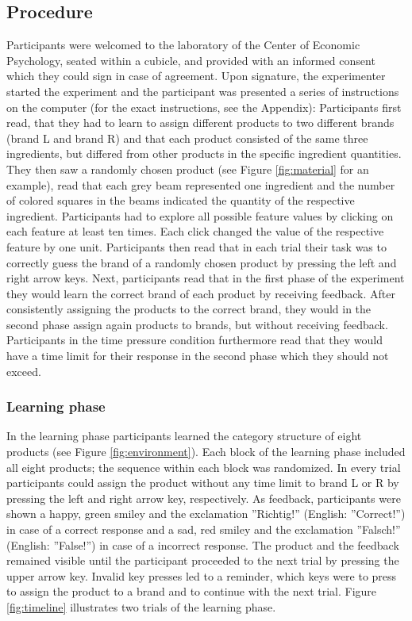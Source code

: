 \documentclass[a4paper,man,natbib]{apa6}
\begin{document}
\subsection{Procedure}
Participants were welcomed to the laboratory of the Center of Economic Psychology, seated within a cubicle, and provided with an informed consent which they could sign in case of agreement. Upon signature, the experimenter started the experiment and the participant was presented a series of instructions on the computer (for the exact instructions, see the Appendix): Participants first read, that they had to learn to assign different products to two different brands (brand L and brand R) and that each product consisted of the same three ingredients, but differed from other products in the specific ingredient quantities. They then saw a randomly chosen product (see Figure \ref{fig:material} for an example), read that each grey beam represented one ingredient and the number of colored squares in the beams indicated the quantity of the respective ingredient. Participants had to explore all possible feature values by clicking on each feature at least ten times. Each click changed the value of the respective feature by one unit. Participants then read that in each trial their task was to correctly guess the brand of a randomly chosen product by pressing the left and right arrow keys. Next, participants read that in the first phase of the experiment they would learn the correct brand of each product by receiving feedback. After consistently assigning the products to the correct brand, they would in the second phase assign again products to brands, but without receiving feedback. Participants in the time pressure condition furthermore read that they would have a time limit for their response in the second phase which they should not exceed.

\subsubsection{Learning phase}
In the learning phase participants learned the category structure of eight products (see Figure \ref{fig:environment}). Each block of the learning phase included all eight products; the sequence within each block was randomized. In every trial participants could assign the product without any time limit to brand L or R by pressing the left and right arrow key, respectively. As feedback, participants were shown a happy, green smiley and the exclamation ''Richtig!'' (English: ''Correct!'') in case of a correct response and a sad, red smiley and the exclamation ''Falsch!'' (English: ''False!'') in case of a incorrect response. The product and the feedback remained visible until the participant proceeded to the next trial by pressing the upper arrow key. 
Invalid key presses led to a reminder, which keys were to press to assign the product to a brand and to continue with the next trial. 
Figure \ref{fig:timeline} illustrates two trials of the learning phase.
\end{document}
